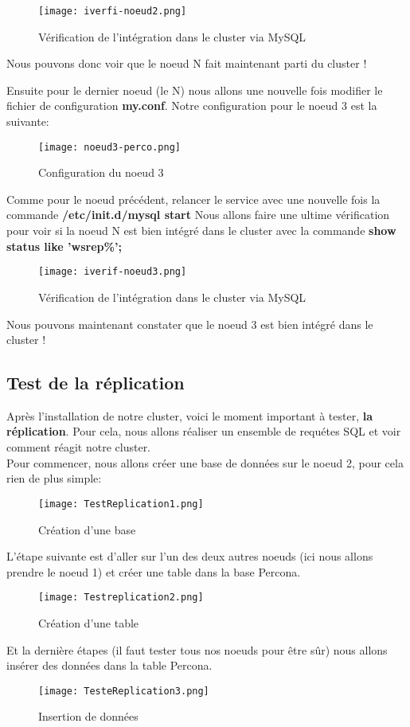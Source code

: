 \documentclass[a4paper,10pt,one side,titlepage]{report}
\begin{document}
\begin{figure}[H]
    \centering
\texttt{[image: iverfi-noeud2.png]} 
    \caption{Vérification de l'intégration dans le cluster via MySQL}
    \label{fig:VerifNoeud2}
\end{figure}
Nous pouvons donc voir que le noeud N fait maintenant parti du cluster !

Ensuite pour le dernier noeud (le N) nous allons une nouvelle fois modifier 
le fichier de configuration \textbf{my.conf}. Notre configuration pour le noeud 3
est la suivante:
\begin{figure}[H]
    \centering
\texttt{[image: noeud3-perco.png]} 
    \caption{Configuration du noeud 3}
    \label{fig:ConfigNoeud3}
\end{figure}
Comme pour le noeud précédent, relancer le service avec une nouvelle 
fois la commande \textbf{/etc/init.d/mysql start}
Nous allons faire une ultime vérification pour voir si la noeud N 
est bien intégré dans le cluster avec la commande \textbf{show status like 'wsrep\%';}
\begin{figure}[h]
    \centering
\texttt{[image: iverif-noeud3.png]} 
    \caption{Vérification de l'intégration dans le cluster via MySQL}
    \label{fig:VerifNoeud3}
\end{figure}
Nous pouvons maintenant constater que le noeud 3 est bien intégré dans le cluster !

\subsection{Test de la réplication}

Après l'installation de notre cluster, voici le moment important à tester, 
\textbf{la réplication}. Pour cela, nous allons réaliser un ensemble de requétes 
SQL et voir comment réagit notre cluster.\\
Pour commencer, nous allons créer une base de données sur le noeud 2, pour cela rien de plus simple:

\begin{figure}[H]
    \centering
\texttt{[image: TestReplication1.png]}
\caption{Création d'une base}
    \label{fig:Testrepli1}
\end{figure}
L'étape suivante est d'aller sur l'un des deux autres noeuds (ici nous allons prendre le noeud 1) et créer une table dans la base Percona.
\begin{figure}[H]
    \centering
\texttt{[image: Testreplication2.png]} 
\caption{Création d'une table}
 \label{fig:Testrepli2}
 \end{figure}
Et la dernière étapes (il faut tester tous nos noeuds pour être sûr) nous allons insérer des données dans la table Percona.
\begin{figure}[H]
    \centering
\texttt{[image: TesteReplication3.png]}
\caption{Insertion de données}
    \label{fig:Testrepli3}
\end{figure} 
\end{document}

